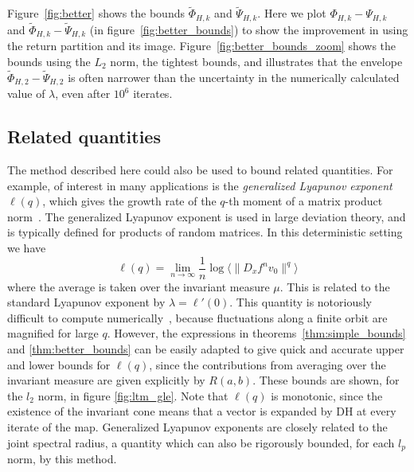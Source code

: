 \documentclass{iopart}
\newcommand{\jitse}[1]{\textcolor{blue}{\bf jitse: #1}}
\begin{document}
Figure~\ref{fig:better} shows the bounds $\tilde{\Phi}_{H,k}$ and $\tilde{\Psi}_{H,k}$. Here we plot $\Phi_{H,k}-\Psi_{H,k}$ and $\tilde{\Phi}_{H,k}-\tilde{\Psi}_{H,k}$ (in figure~\ref{fig:better_bounds}) to show the improvement in using the return partition 
and its image. Figure~\ref{fig:better_bounds_zoom} shows the bounds using 
the $L_2$ norm, the tightest bounds, and illustrates that the envelope $\tilde{\Phi}_{H,2}-\tilde{\Psi}_{H,2}$ is often narrower than the uncertainty in the numerically calculated value of $\lambda$, even after $10^6$ iterates.





\subsection{Related quantities}

The method described here could also be used to bound related quantities. 
For example, of interest in many applications is the {\em generalized Lyapunov exponent} $\ell(q)$, which gives the growth rate of the $q$-th moment of a matrix product norm~\cite{crisanti_generalized_1988}. The generalized Lyapunov exponent is used in large deviation theory, and is typically defined for products of random matrices. In this deterministic setting we have
\begin{equation}\label{eq:gle}
\ell(q) = \lim_{n \to \infty} \frac{1}{n} \log \langle \|D_x f^n v_0 \|^q \rangle
\end{equation}
where the average is taken over the invariant measure $\mu$. This is related to the standard Lyapunov exponent by $\lambda = \ell'(0)$. This quantity is notoriously difficult to compute numerically~\cite{vanneste2010estimating}, because fluctuations along a finite orbit are magnified for large 
$q$. However, the expressions in theorems~\ref{thm:simple_bounds} and \ref{thm:better_bounds} can be easily adapted to give quick and accurate upper and lower bounds for $\ell(q)$, since the contributions from averaging 
over the invariant measure are given explicitly by $R(a,b)$. These bounds 
are shown, for the $l_2$ norm, in figure \ref{fig:ltm_gle}. Note that $\ell(q)$ is monotonic, since the existence of the invariant cone means that 
a vector is expanded by DH at every iterate of the map. Generalized Lyapunov exponents are closely related to the joint spectral radius, a quantity which can also be rigorously bounded, for each $l_p$ norm, by this method. 
\end{document}
